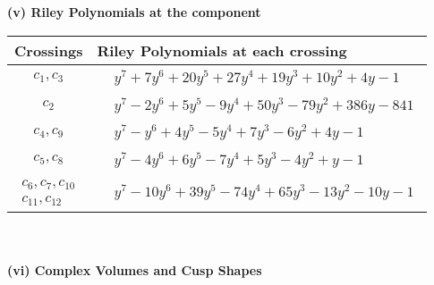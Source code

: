 \documentclass[1p]{elsarticle_modified}
\theoremstyle{definition}
\begin{document}
\newpage\renewcommand{\arraystretch}{1}
\flushleft \textbf{(v) Riley Polynomials at the component}\newline \\
\begin{tabular}{m{50pt}|m{274pt}}
Crossings & \hspace{64pt}Riley Polynomials at each crossing \\
\hline $$\begin{aligned}c_{1},c_{3}\end{aligned}$$&$\begin{aligned}
&y^7+7 y^6+20 y^5+27 y^4+19 y^3+10 y^2+4 y-1
\end{aligned}$\\
\hline $$\begin{aligned}c_{2}\end{aligned}$$&$\begin{aligned}
&y^7-2 y^6+5 y^5-9 y^4+50 y^3-79 y^2+386 y-841
\end{aligned}$\\
\hline $$\begin{aligned}c_{4},c_{9}\end{aligned}$$&$\begin{aligned}
&y^7- y^6+4 y^5-5 y^4+7 y^3-6 y^2+4 y-1
\end{aligned}$\\
\hline $$\begin{aligned}c_{5},c_{8}\end{aligned}$$&$\begin{aligned}
&y^7-4 y^6+6 y^5-7 y^4+5 y^3-4 y^2+y-1
\end{aligned}$\\
\hline $$\begin{aligned}c_{6},c_{7},c_{10}\\c_{11},c_{12}\end{aligned}$$&$\begin{aligned}
&y^7-10 y^6+39 y^5-74 y^4+65 y^3-13 y^2-10 y-1
\end{aligned}$\\
\hline
\end{tabular}\\~\\
\newpage\flushleft \textbf{(vi) Complex Volumes and Cusp Shapes}
\end{document}
